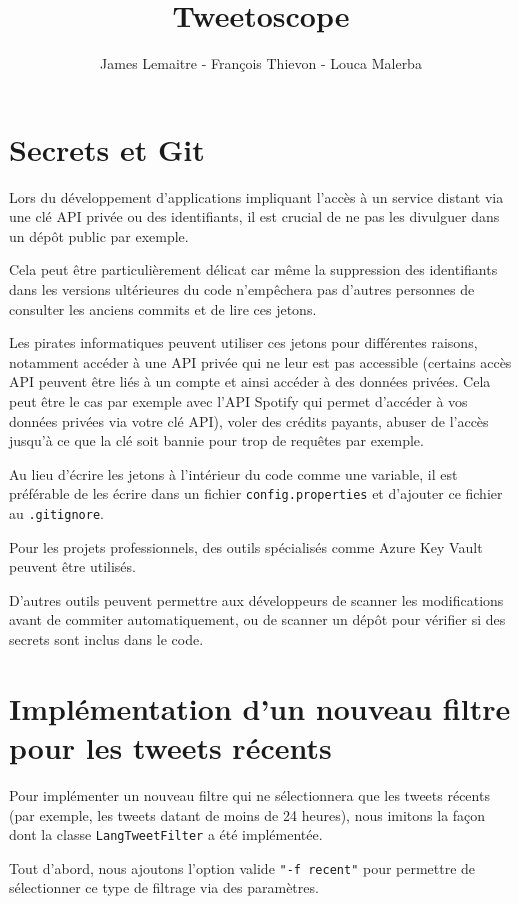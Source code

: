 \documentclass[10pt,a4paper]{article}
\author{James Lemaitre - François Thievon - Louca Malerba}
\title{Tweetoscope}
\begin{document}
	\maketitle
	
\section{Secrets et Git}

Lors du développement d'applications impliquant l'accès à un service distant via une clé API privée ou des identifiants, il est crucial de ne pas les divulguer dans un dépôt public par exemple.

Cela peut être particulièrement délicat car même la suppression des identifiants dans les versions ultérieures du code n'empêchera pas d'autres personnes de consulter les anciens commits et de lire ces jetons.

Les pirates informatiques peuvent utiliser ces jetons pour différentes raisons, notamment accéder à une API privée qui ne leur est pas accessible (certains accès API peuvent être liés à un compte et ainsi accéder à des données privées. Cela peut être le cas par exemple avec l'API Spotify qui permet d'accéder à vos données privées via votre clé API), voler des crédits payants, abuser de l'accès jusqu'à ce que la clé soit bannie pour trop de requêtes par exemple.

Au lieu d'écrire les jetons à l'intérieur du code comme une variable, il est préférable de les écrire dans un fichier \texttt{config.properties} et d'ajouter ce fichier au \texttt{.gitignore}.

Pour les projets professionnels, des outils spécialisés comme Azure Key Vault peuvent être utilisés.

D'autres outils peuvent permettre aux développeurs de scanner les modifications avant de commiter automatiquement, ou de scanner un dépôt pour vérifier si des secrets sont inclus dans le code.

\section{Implémentation d'un nouveau filtre pour les tweets récents}

Pour implémenter un nouveau filtre qui ne sélectionnera que les tweets récents (par exemple, les tweets datant de moins de 24 heures), nous imitons la façon dont la classe \texttt{LangTweetFilter} a été implémentée.

Tout d'abord, nous ajoutons l'option valide \texttt{"-f recent"} pour permettre de sélectionner ce type de filtrage via des paramètres.
\end{document}

